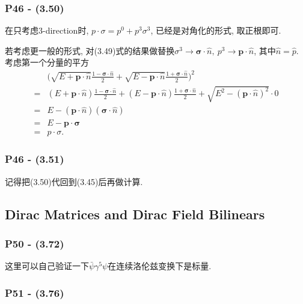 \documentclass[cn,hazy,green,11pt,device=normal,chinesefont=founder]{elegantnote}
\begin{document}
\subsubsection{P46 - (3.50)}

在只考虑3-direction时, $p\cdot \sigma = p^0 + p^3\sigma^3$, 已经是对角化的形式, 取正根即可. 

若考虑更一般的形式, 对(3.49)式的结果做替换$\sigma^3 \rightarrow \boldsymbol{\sigma}\cdot\hat{n},\ p^3 \rightarrow \mathbf{p}\cdot\hat{n}$, 其中$\hat{n} = \hat{p}$. 考虑第一个分量的平方
\begin{equation}
  \begin{aligned}
    &\biggl(\sqrt{E+\mathbf{p}\cdot\hat{n}} \frac{1-\boldsymbol{\sigma}\cdot\hat{n}}{2} + \sqrt{E-\mathbf{p}\cdot\hat{n}} \frac{1+\boldsymbol{\sigma}\cdot\hat{n}}{2} \biggr)^2 \\ 
    =& (E+\mathbf{p}\cdot\hat{n}) \frac{1-\boldsymbol{\sigma}\cdot\hat{n}}{2} + (E-\mathbf{p}\cdot\hat{n}) \frac{1+\boldsymbol{\sigma}\cdot\hat{n}}{2} + \sqrt{E^2 - (\mathbf{p}\cdot\hat{n})^2} \cdot 0 \\
    =& E - (\mathbf{p}\cdot\hat{n})(\boldsymbol{\sigma}\cdot\hat{n}) \\
    =& E - \mathbf{p} \cdot \boldsymbol{\sigma} \\
    =& p \cdot \sigma .
  \end{aligned}
\end{equation}

\subsubsection{P46 - (3.51)}

记得把(3.50)代回到(3.45)后再做计算. 

\subsection{Dirac Matrices and Dirac Field Bilinears}

\subsubsection{P50 - (3.72)}

这里可以自己验证一下$\bar{\psi} \gamma^5 \psi$在连续洛伦兹变换下是标量.

\subsubsection{P51 - (3.76)}
\end{document}
